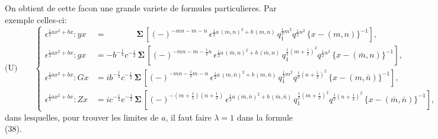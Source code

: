 \documentclass[11pt,a4paper]{book}
\begin{document}
On obtient de cette facon une grande variete de formules particulieres. Par
exemple celles-ci:
\begin{equation*}
\text{(U)}\qquad
\left\{
\begin{aligned}
\epsilon^{\frac{1}{2}ax^2+bx} : yx &= \phantom{-b^{-\frac{1}{2}}c^{-\frac{1}{2}}}\boldsymbol{\Sigma}\, [(-)^{-mn-m-n}\, \epsilon^{\frac{1}{2}a\, (m, n)^2+b\, (m, n)}\, q_1^{\frac{1}{2}m^2} q^{\frac{1}{2}n^2}\, \{x - (m, n)\}^{-1}],\\
\epsilon^{\frac{1}{2}ax^2+bx} : gx &= -b^{-\frac{1}{2}} c^{-\frac{1}{2}}\, \boldsymbol{\Sigma}\, [(-)^{-mn-m-\frac{1}{2}n}\, \epsilon^{\frac{1}{2}a\, (\bar{m}, n)^2+b\, (\bar{m}, n)}\, q_1^{\frac{1}{2}(m+\frac{1}{2})^2} q^{\frac{1}{2}n^2}\, \{x - (\bar{m}, n)\}^{-1}],\\
\epsilon^{\frac{1}{2}ax^2+bx} : Gx &= ib^{-\frac{1}{2}} c^{-\frac{1}{2}}\, \boldsymbol{\Sigma}\, [(-)^{-mn-\frac{1}{2}m-n}\, \epsilon^{\frac{1}{2}a\, (m, \bar{n})^2+b\, (m, \bar{n})}\, q_1^{\frac{1}{2}m^2} q^{\frac{1}{2}(n+\frac{1}{2})^2}\, \{x - (m, \bar{n})\}^{-1}],\\
\epsilon^{\frac{1}{2}ax^2+bx} : Zx &= ic^{-\frac{1}{2}} e^{-\frac{1}{2}}\, \boldsymbol{\Sigma}\, [(-)^{-(m+\frac{1}{2})(n+\frac{1}{2})}\, \epsilon^{\frac{1}{2}a\, (\bar{m}, \bar{n})^2+b\, (\bar{m}, \bar{n})}\, q_1^{\frac{1}{2}(m+\frac{1}{2})^2} q^{\frac{1}{2}(n+\frac{1}{2})^2}\, \{x - (\bar{m}, \bar{n})\}^{-1}],
\end{aligned}
\right.
\end{equation*}
dans lesquelles, pour trouver les limites de $a$, il faut faire $\lambda = 1$ dans la formule (38).
\end{document}
